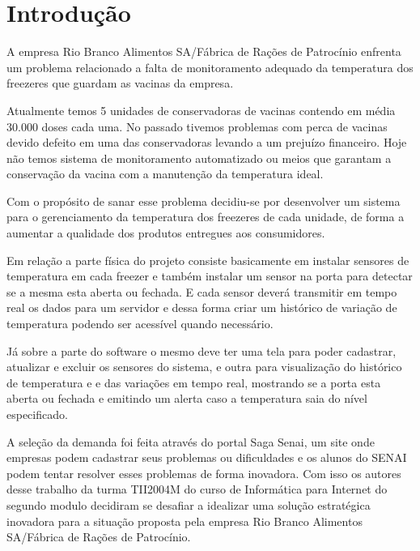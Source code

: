 \chapter{Introdução}

    A empresa 
    Rio Branco Alimentos SA/Fábrica de Rações de Patrocínio
    enfrenta um problema relacionado a falta de monitoramento 
    adequado da temperatura dos freezeres que guardam as vacinas
    da empresa.

    \begin{citacao}
        Atualmente temos 5 unidades de conservadoras de vacinas contendo 
        em média 30.000 doses cada uma.
        No passado tivemos problemas com perca de vacinas devido 
        defeito em uma das conservadoras levando a um prejuízo financeiro.
        Hoje não temos sistema de monitoramento automatizado ou meios 
        que garantam a conservação da vacina com a 
        manutenção da temperatura ideal. \cite{senaiDemanda}
    \end{citacao}

    Com o propósito de sanar esse problema decidiu-se por desenvolver
    um sistema para o gerenciamento da temperatura dos freezeres
    de cada unidade, de forma a aumentar a qualidade dos produtos
    entregues aos consumidores.

    Em relação a parte física do projeto consiste basicamente
    em instalar sensores de temperatura em cada freezer e 
    também instalar um sensor na porta para detectar se a 
    mesma esta aberta ou fechada. E cada sensor deverá transmitir 
    em tempo real os dados para um servidor e dessa forma 
    criar um histórico de variação de temperatura podendo 
    ser acessível quando necessário.

    Já sobre a parte do software o mesmo deve ter uma tela para
    poder cadastrar, atualizar e excluir os sensores do sistema, 
    e outra para visualização do histórico de temperatura e 
    e das variações em tempo real, mostrando se a porta esta 
    aberta ou fechada e emitindo um alerta caso a temperatura
    saia do nível especificado.

    A seleção da demanda foi feita através do portal Saga Senai, um 
    site onde empresas podem cadastrar seus problemas ou 
    dificuldades e os alunos do SENAI podem tentar resolver 
    esses problemas de forma inovadora. 
    Com isso os autores desse trabalho da turma TII2004M
    do curso de Informática para Internet do segundo modulo
    decidiram se desafiar a idealizar 
    uma solução estratégica inovadora para a situação 
    proposta pela empresa 
    Rio Branco Alimentos SA/Fábrica de Rações de Patrocínio.

